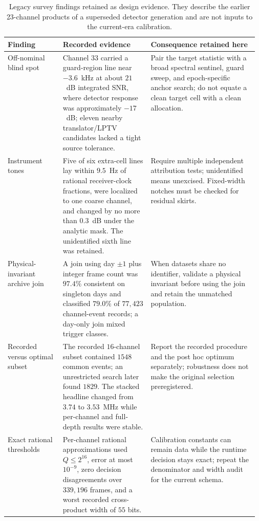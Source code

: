 \begin{table}[t]
\centering
\caption[Legacy survey findings retained as design evidence]{Legacy survey findings retained as design evidence.  They describe the
earlier 23-channel products of a superseded detector generation and are not
inputs to the current-era calibration.}
\label{tab:legacy:forensics}
\small
\setlength{\tabcolsep}{4pt}
\begin{tabularx}{\linewidth}{>{\raggedright\arraybackslash}p{0.22\linewidth}
                              >{\raggedright\arraybackslash}p{0.35\linewidth}
                              >{\raggedright\arraybackslash}X}
\toprule
Finding & Recorded evidence & Consequence retained here \\
\midrule
Off-nominal blind spot & Channel 33 carried a guard-region line near
$-3.6$~kHz at about $21$~dB integrated SNR, where detector response was
approximately $-17$~dB; eleven nearby translator/LPTV candidates lacked a
tight source tolerance. & Pair the target statistic with a broad spectral
sentinel, guard sweep, and epoch-specific anchor search; do not equate a clean
target cell with a clean allocation. \\

Instrument tones & Five of six extra-cell lines lay within $9.5$~Hz of rational
receiver-clock fractions, were localized to one coarse channel, and changed by
no more than $0.3$~dB under the analytic mask.  The unidentified sixth line was
retained. & Require multiple independent attribution tests; unidentified means
unexcised.  Fixed-width notches must be checked for residual skirts. \\

Physical-invariant archive join & A join using day $\pm1$ plus integer frame
count was $97.4\%$ consistent on singleton days and classified $79.0\%$ of
$77{,}423$ channel-event records; a day-only join mixed trigger classes. & When
datasets share no identifier, validate a physical invariant before using the
join and retain the unmatched population. \\

Recorded versus optimal subset & The recorded $16$-channel subset contained
$1548$ common events; an unrestricted search later found $1829$.  The stacked
headline changed from $3.74$ to $3.53$~MHz while per-channel and full-depth
results were stable. & Report the recorded procedure and the post hoc optimum
separately; robustness does not make the original selection preregistered. \\

Exact rational thresholds & Per-channel rational approximations used
$Q\le2^{16}$, error at most $10^{-9}$, zero decision disagreements over
$339{,}196$ frames, and a worst recorded cross-product width of $55$ bits. &
Calibration constants can remain data while the runtime decision stays exact;
repeat the denominator and width audit for the current schema. \\
\bottomrule
\end{tabularx}
\end{table}

